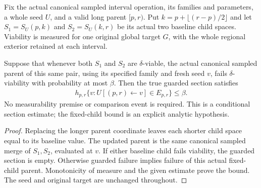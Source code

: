 \begin{lemma}
    \label{thm:canonical_guarded_sampling_section}
    \leanok
    Fix the actual canonical sampled interval operation, its families and
    parameters, a whole seed $U$, and a valid long parent $[p,r)$.
    Put $k=p+\lfloor(r-p)/2\rfloor$ and let
    $S_1=S_U(p,k)$ and $S_2=S_U(k,r)$ be its actual two baseline
    child spaces. Viability is measured for one original global target
    $G$, with the whole regional exterior retained at each interval.

    Suppose that whenever both $S_1$ and $S_2$ are $\delta$-viable, the
    actual canonical sampled parent of this same pair, using its specified
    family and fresh seed $v$, fails $\delta$-viability with probability
    at most $\beta$. Then the true guarded section satisfies
    \begin{align}
        h_{p,r}\{v:U[(p,r)\leftarrow v]\in E_{p,r}\}\le\beta.
    \end{align}
    No measurability premise or comparison event is required.
    This is a conditional section estimate; the fixed-child bound is
    an explicit analytic hypothesis.
\end{lemma}
\begin{proof}\leanok
    Replacing the longer parent coordinate leaves each shorter child
    space equal to its baseline value. The updated parent is the same
    canonical sampled merge of $S_1,S_2$, evaluated at $v$.
    If either baseline child fails viability, the guarded section is
    empty. Otherwise guarded failure implies failure of this actual
    fixed-child parent. Monotonicity of measure and the given estimate
    prove the bound. The seed and original target are unchanged throughout.
\end{proof}


